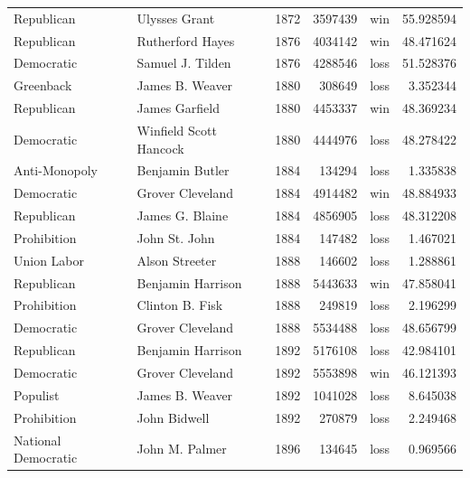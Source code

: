 \documentclass[
  letterpaper,
  DIV=11,
  numbers=noendperiod]{scrreprt}
\begin{document}
\begin{tabular}{llrrlr}
Republican            &           Ulysses Grant &  1872 &       3597439 &    win &  55.928594 \\
Republican            &        Rutherford Hayes &  1876 &       4034142 &    win &  48.471624 \\
Democratic            &        Samuel J. Tilden &  1876 &       4288546 &   loss &  51.528376 \\
Greenback             &         James B. Weaver &  1880 &        308649 &   loss &   3.352344 \\
Republican            &          James Garfield &  1880 &       4453337 &    win &  48.369234 \\
Democratic            &  Winfield Scott Hancock &  1880 &       4444976 &   loss &  48.278422 \\
Anti-Monopoly         &         Benjamin Butler &  1884 &        134294 &   loss &   1.335838 \\
Democratic            &        Grover Cleveland &  1884 &       4914482 &    win &  48.884933 \\
Republican            &         James G. Blaine &  1884 &       4856905 &   loss &  48.312208 \\
Prohibition           &           John St. John &  1884 &        147482 &   loss &   1.467021 \\
Union Labor           &          Alson Streeter &  1888 &        146602 &   loss &   1.288861 \\
Republican            &       Benjamin Harrison &  1888 &       5443633 &    win &  47.858041 \\
Prohibition           &         Clinton B. Fisk &  1888 &        249819 &   loss &   2.196299 \\
Democratic            &        Grover Cleveland &  1888 &       5534488 &   loss &  48.656799 \\
Republican            &       Benjamin Harrison &  1892 &       5176108 &   loss &  42.984101 \\
Democratic            &        Grover Cleveland &  1892 &       5553898 &    win &  46.121393 \\
Populist              &         James B. Weaver &  1892 &       1041028 &   loss &   8.645038 \\
Prohibition           &            John Bidwell &  1892 &        270879 &   loss &   2.249468 \\
National Democratic   &          John M. Palmer &  1896 &        134645 &   loss &   0.969566 \\

\end{tabular}
\end{document}
